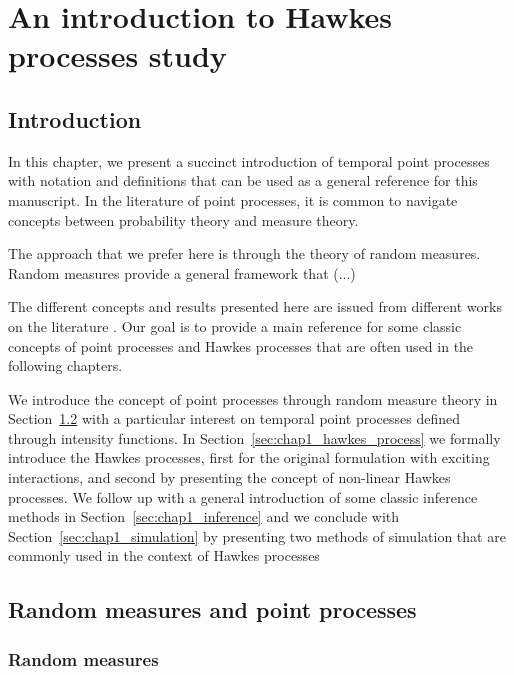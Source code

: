 \leadchapter{
  
}

\chapter[][]{An introduction to Hawkes processes study}\label{chapter:background}

\section{Introduction}

In this chapter, we present a succinct introduction of temporal point processes with notation and definitions that can be used as a general reference for this manuscript.
In the literature of point processes, it is common to navigate concepts between probability theory and measure theory.

The approach that we prefer here is through the theory of random measures.
Random measures provide a general framework that (...)

The different concepts and results presented here are issued from different works on the literature \parencite{Cox1980, Baddeley2006, DaleyV2, Baccelli2020}. 
Our goal is to provide a main reference for some classic concepts of point processes and Hawkes processes that are often used in the following chapters.

We introduce the concept of point processes through random measure theory in Section~\ref{sec:chap1_random_measures} with a particular interest on temporal point processes defined through intensity functions. 
In Section~\ref{sec:chap1_hawkes_process} we formally introduce the Hawkes processes, first for the original formulation with exciting interactions, and second by presenting the concept of non-linear Hawkes processes. 
We follow up with a general introduction of some classic inference methods in Section~\ref{sec:chap1_inference} and we conclude with Section~\ref{sec:chap1_simulation} by presenting two methods of simulation that are commonly used in the context of Hawkes processes

\section{Random measures and point processes}\label{sec:chap1_random_measures}

\subsection{Random measures}

